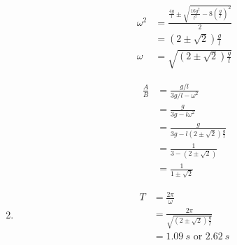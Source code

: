 \documentclass{article}
\begin{document}
\begin{enumerate}
        \begin{align*}
          \omega^2 & = \frac{\frac{4 g}{l} \pm \sqrt{\frac{16 g^2}{l^2} - 8 \left( \frac{g}{l} \right)^2}}{2} \\
                   & = (2 \pm \sqrt{2}) \frac{g}{l}                                                           \\
          \omega   & = \sqrt{(2 \pm \sqrt{2}) \frac{g}{l}}
        \end{align*}

        \begin{align*}
          \frac{A}{B} & = \frac{g / l}{3 g / l - \omega^2}               \\
                      & = \frac{g}{3 g - l \omega^2}                     \\
                      & = \frac{g}{3 g - l (2 \pm \sqrt{2}) \frac{g}{l}} \\
                      & = \frac{1}{3 - (2 \pm \sqrt{2})}                 \\
                      & = \frac{1}{1 \pm \sqrt{2}}
        \end{align*}

  \item

        \begin{align*}
          T & = \frac{2 \pi}{\omega}                              \\
            & = \frac{2 \pi}{\sqrt{(2 \pm \sqrt{2}) \frac{g}{l}}} \\
            & = \qty{1.09}{s} \text{ or } \qty{2.62}{s}
        \end{align*}
\end{enumerate}

\subsection{}
\end{document}
